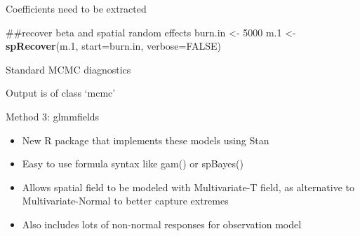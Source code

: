 \documentclass[ignorenonframetext,]{beamer}
\newenvironment{Shaded}{\begin{snugshade}}{\end{snugshade}}
\newcommand{\DataTypeTok}[1]{\textcolor[rgb]{0.13,0.29,0.53}{#1}}
\newcommand{\DecValTok}[1]{\textcolor[rgb]{0.00,0.00,0.81}{#1}}
\newcommand{\FloatTok}[1]{\textcolor[rgb]{0.00,0.00,0.81}{#1}}
\newcommand{\KeywordTok}[1]{\textcolor[rgb]{0.13,0.29,0.53}{\textbf{#1}}}
\newcommand{\NormalTok}[1]{#1}
\newcommand{\OtherTok}[1]{\textcolor[rgb]{0.56,0.35,0.01}{#1}}
\newcommand{\StringTok}[1]{\textcolor[rgb]{0.31,0.60,0.02}{#1}}
\begin{document}
\begin{frame}[fragile]{Coefficients need to be extracted}
\protect\hypertarget{coefficients-need-to-be-extracted}{}

\begin{Shaded}
\begin{Highlighting}[]
\NormalTok{##recover beta and spatial random effects}
\NormalTok{burn.in <-}\StringTok{ }\DecValTok{5000}
\NormalTok{m}\FloatTok{.1}\NormalTok{ <-}\StringTok{ }\KeywordTok{spRecover}\NormalTok{(m}\FloatTok{.1}\NormalTok{, }\DataTypeTok{start=}\NormalTok{burn.in, }\DataTypeTok{verbose=}\OtherTok{FALSE}\NormalTok{)}
\end{Highlighting}
\end{Shaded}

\end{frame}

\begin{frame}{Standard MCMC diagnostics}
\protect\hypertarget{standard-mcmc-diagnostics}{}

Output is of class `mcmc'

\end{frame}

\begin{frame}{Method 3: glmmfields}
\protect\hypertarget{method-3-glmmfields}{}

\begin{itemize}
\item
  New R package that implements these models using Stan
\item
  Easy to use formula syntax like gam() or spBayes()
\item
  Allows spatial field to be modeled with Multivariate-T field, as
  alternative to Multivariate-Normal to better capture extremes
\item
  Also includes lots of non-normal responses for observation model
\end{itemize}

\end{frame}
\end{document}
